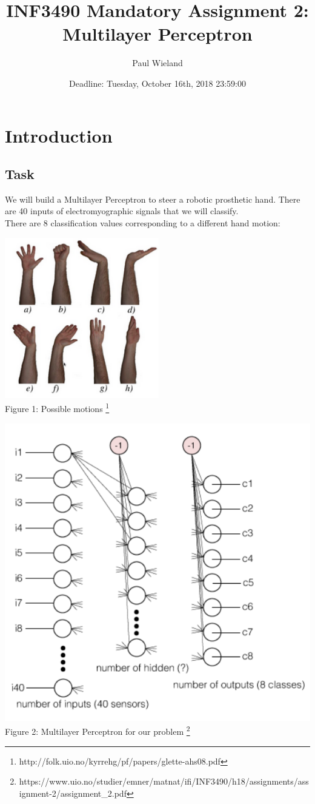 \documentclass[10pt,a4paper]{article}
\author{Paul Wieland}
\title{INF3490 Mandatory Assignment 2:
	Multilayer Perceptron}
\date{Deadline: Tuesday, October 16th, 2018 23:59:00}
\begin{document}
	\maketitle
	\tableofcontents
	\newpage
	\section{Introduction}
	\subsection{Task}									%
	We will build a Multilayer Perceptron to steer a robotic prosthetic hand. There are 40 inputs of electromyographic signals that we will classify. \\
	There are 8 classification values corresponding to a different hand motion: \\
	\begin{center}
		\includegraphics[width=0.4\linewidth]{pictures/hand}
		\\
		Figure 1: Possible motions \footnote{http://folk.uio.no/kyrrehg/pf/papers/glette-ahs08.pdf}
		\\
	\end{center}
	\begin{center}
		\includegraphics[width=0.7\linewidth]{pictures/mlp}
		\\
		Figure 2: Multilayer Perceptron for our problem \footnote{https://www.uio.no/studier/emner/matnat/ifi/INF3490/h18/assignments/assignment-2/assignment\_2.pdf}
		\\
	\end{center}
\end{document}
